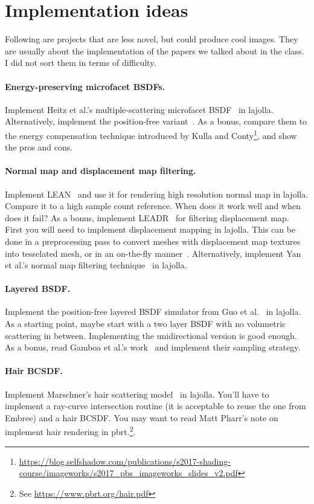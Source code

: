 \section{Implementation ideas}

Following are projects that are less novel, but could produce cool images. 
They are usually about the implementation of the papers we talked about in the class.
I did not sort them in terms of difficulty.

\paragraph{Energy-preserving microfacet BSDFs.} 
Implement Heitz et al.'s multiple-scattering microfacet BSDF~\cite{Heitz:2016:MMB} in lajolla.
Alternatively, implement the position-free variant~\cite{Wang:2022:PMC}.
As a bonus, compare them to the energy compensation technique introduced by Kulla and Conty\footnote{\url{https://blog.selfshadow.com/publications/s2017-shading-course/imageworks/s2017_pbs_imageworks_slides_v2.pdf}}, and show the pros and cons.

\paragraph{Normal map and displacement map filtering.}
Implement LEAN~\cite{Olano:2010:LM} and use it for rendering high resolution normal map in lajolla.
Compare it to a high sample count reference.
When does it work well and when does it fail?
As a bonus, implement LEADR~\cite{Dupuy:2013:LEA} for filtering displacement map.
First you will need to implement displacement mapping in lajolla.
This can be done in a preprocessing pass to convert meshes with displacement map textures into tesselated mesh, or in an on-the-fly manner~\cite{Thonat:2021:TDM}.
Alternatively, implement Yan et al.'s normal map filtering technique~\cite{Yan:2014:RGH} in lajolla. 

\paragraph{Layered BSDF.}
Implement the position-free layered BSDF simulator from Guo et al.~\cite{Guo:2018:PMC} in lajolla.
As a starting point, maybe start with a two layer BSDF with no volumetric scattering in between.
Implementing the unidirectional version is good enough.
As a bonus, read Gamboa et al.'s work~\cite{Gamboa:2020:ETE} and implement their sampling strategy.

\paragraph{Hair BCSDF.}
Implement Marschner's hair scattering model~\cite{Marschner:2003:LSH} in lajolla.
You'll have to implement a ray-curve intersection routine (it is acceptable to reuse the one from Embree) and a hair BCSDF.
You may want to read Matt Pharr's note on implement hair rendering in pbrt.\footnote{See \url{https://www.pbrt.org/hair.pdf}}. 


